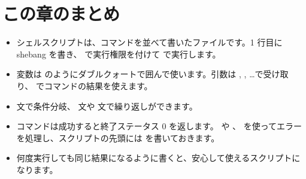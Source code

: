 \section*{この章のまとめ}

\begin{itemize}
  \item シェルスクリプトは、コマンドを並べて書いたファイルです。1 行目に shebang を書き、 で実行権限を付けて  で実行します。
  \item 変数は  のようにダブルクォートで囲んで使います。引数は , , \ldots で受け取り、 でコマンドの結果を使えます。
  \item {} 文で条件分岐、 文や  文で繰り返しができます。
  \item コマンドは成功すると終了ステータス 0 を返します。\cmd{\&\&} や \cmd{||}、 を使ってエラーを処理し、スクリプトの先頭には  を書いておきます。
  \item 何度実行しても同じ結果になるように書くと、安心して使えるスクリプトになります。
\end{itemize}
